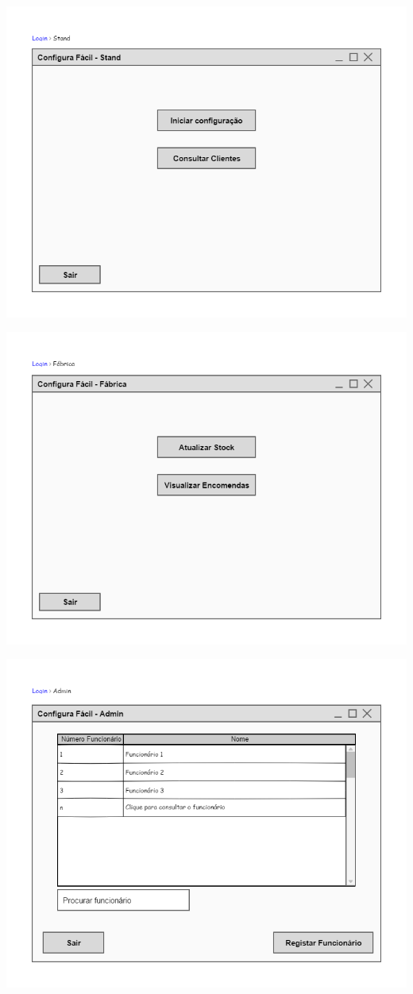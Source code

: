 \documentclass[11pt]{article} %
\begin{document}
\begin{center}
 	\includegraphics[width = 5.5in]{configura_fcil_stand.png}

 	\includegraphics[width = 5.5in]{configura_fcil_fbrica.png}

 	\includegraphics[width = 5.5in]{configura_fcil_admin.png}
\end{center}
\end{document}

